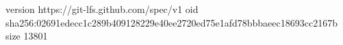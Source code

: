 version https://git-lfs.github.com/spec/v1
oid sha256:02691edecc1c289b409128229e40ee2720ed75e1afd78bbbaeec18693cc2167b
size 13801
